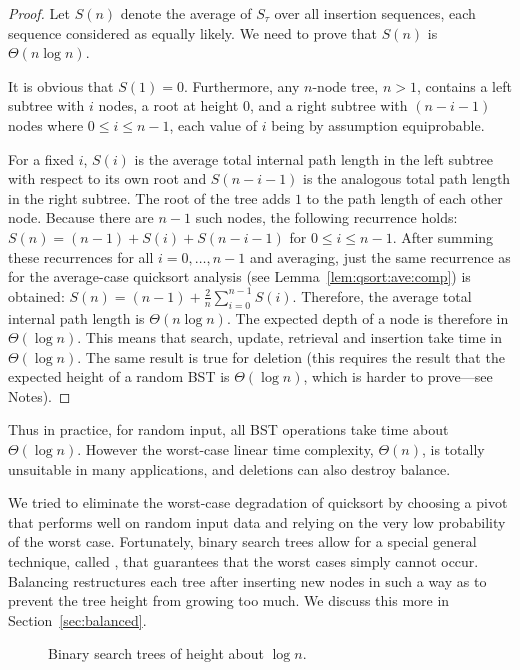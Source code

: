 \begin{proof}
Let $S(n)$ denote the average of $S_\tau$ over all insertion 
sequences, each sequence considered as equally likely. 
We need to prove that $S(n)$ is $\Theta(n \log n)$. 

It is obvious that $S(1)=0$. Furthermore, any $n$-node tree,
$n > 1$, contains a left subtree with $i$ nodes, a root at height $0$,
and a right subtree with $(n-i-1)$ nodes where $0 \le i \le n-1$,
each value of $i$ being by assumption equiprobable. 

For a fixed $i$, $S(i)$ is the average total internal path length in the
left subtree with respect to its own root and $S(n-i-1)$ is the
analogous total path length in the right subtree. The root of the tree
adds $1$ to the path length of each other node. Because there are
$n-1$ such nodes, the following recurrence holds:
\(S(n) = (n-1) + S(i) + S(n-i-1)\) for \(0 \le i \le n-1\).
After summing these recurrences for all $i=0,\ldots,n-1$ and averaging,
just the same recurrence as for the average-case 
quicksort analysis (see Lemma~\ref{lem:qsort:ave:comp}) is obtained:
\(
S(n) = (n-1) + \frac{2}{n} \sum_{i=0}^{n-1} S(i) 
\).
Therefore, the average total internal path length is $\Theta(n \log n)$. The 
expected depth of a node is therefore in $\Theta(\log n)$. This means that 
search, update, retrieval and insertion take time in $\Theta(\log n)$. The same 
result is true for deletion (this requires the result that the expected height 
of a random BST is $\Theta(\log n)$, which is harder to prove---see Notes).
\end{proof}

Thus in practice, for random input, all BST operations take time about 
$\Theta(\log n)$. However the worst-case linear time complexity, $\Theta(n)$, 
is totally unsuitable in many applications, and deletions can also destroy 
balance. 

We tried to eliminate the worst-case degradation of 
quicksort by choosing a pivot that performs well on random input data
and relying on the very low probability of the worst case. Fortunately, binary 
search trees allow for a special general technique, called , 
that guarantees that the worst cases simply cannot occur. Balancing 
restructures each tree after inserting new nodes in such a way as to prevent 
the tree height from growing too much. We discuss this more in 
Section~\ref{sec:balanced}.

\begin{figure}[htb!]
\centerline{
}
\caption{\label{btr-blns} Binary search trees of height about $\log n$.}
\end{figure}

